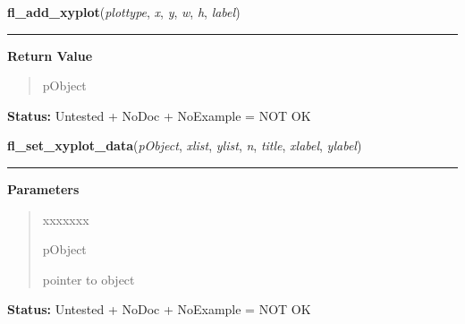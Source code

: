 \hspace{.8\funcindent}\begin{boxedminipage}{\funcwidth}

    \raggedright \textbf{fl\_add\_xyplot}(\textit{plottype}, \textit{x}, \textit{y}, \textit{w}, \textit{h}, \textit{label})

    \vspace{-1.5ex}

    \rule{\textwidth}{0.5\fboxrule}
\setlength{\parskip}{2ex}
\setlength{\parskip}{1ex}
      \textbf{Return Value}
    \vspace{-1ex}

      \begin{quote}
      pObject

      \end{quote}

\textbf{Status:} Untested + NoDoc + NoExample = NOT OK



    \end{boxedminipage}

    \label{xformslib:library:fl_set_xyplot_data}

    \vspace{0.5ex}

\hspace{.8\funcindent}\begin{boxedminipage}{\funcwidth}

    \raggedright \textbf{fl\_set\_xyplot\_data}(\textit{pObject}, \textit{xlist}, \textit{ylist}, \textit{n}, \textit{title}, \textit{xlabel}, \textit{ylabel})

    \vspace{-1.5ex}

    \rule{\textwidth}{0.5\fboxrule}
\setlength{\parskip}{2ex}
\setlength{\parskip}{1ex}
      \textbf{Parameters}
      \vspace{-1ex}

      \begin{quote}
        \begin{Ventry}{xxxxxxx}

          \item[pObject]

          pointer to object

        \end{Ventry}

      \end{quote}

\textbf{Status:} Untested + NoDoc + NoExample = NOT OK



    \end{boxedminipage}

